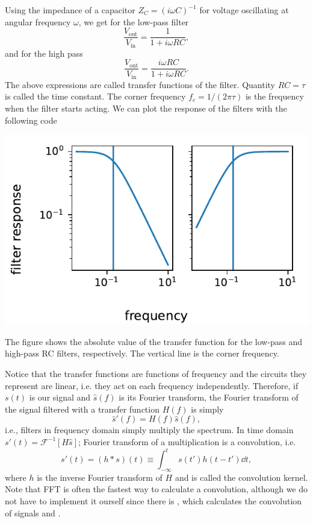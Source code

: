 Using the impedance of a capacitor $Z_C = (i\omega C)^{-1}$ for voltage oscillating at angular frequency $\omega$, we get for the low-pass filter
\begin{equation}
    \frac{V_\mathrm{out}}{V_\mathrm{in}} = \frac{1}{1 + i\omega RC},
\end{equation}
and for the high pass
\begin{equation}
    \frac{V_\mathrm{out}}{V_\mathrm{in}} = \frac{i\omega RC}{1 + i\omega RC}.
\end{equation}
The above expressions are called transfer functions of the filter. Quantity $RC = \tau$ is called the time constant. The corner frequency $f_c = 1/(2\pi\tau)$ is the frequency when the filter starts acting. We can plot the response of the filters with the following code

\begin{center}
    \includegraphics{RC_filters.pdf}
\end{center}
The figure shows the absolute value of the transfer function for the low-pass and high-pass RC filters, respectively. The vertical line is the corner frequency.

Notice that the transfer functions are functions of frequency and the circuits they represent are linear, i.e. they act on each frequency independently. Therefore, if $s(t)$ is our signal and $\hat s(f)$ is its Fourier transform, the Fourier transform of the signal filtered with a transfer function $H(f)$ is simply
\begin{equation}
    \hat s'(f) = H(f)\hat s(f),
\end{equation}
i.e., filters in frequency domain simply multiply the spectrum. In time domain $s'(t) = \mathcal{F}^{-1}[H\hat s]$; Fourier transform of a multiplication is a convolution, i.e.
\begin{equation}
    s'(t) = (h*s)(t) \equiv \int_{-\infty}^t s(t')h(t - t')\dd t,
\end{equation}
where $h$ is the inverse Fourier transform of $H$ and is called the convolution kernel. Note that FFT is often the fastest way to calculate a convolution, although we do not have to implement it ourself since there is , which calculates the convolution of signals  and .

